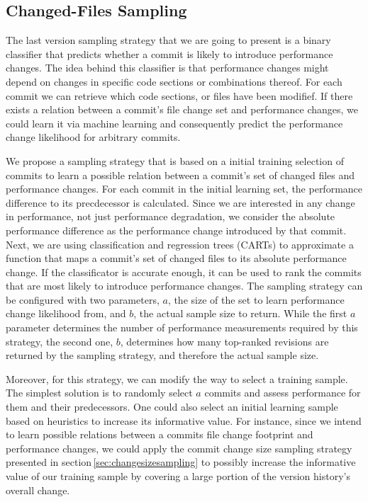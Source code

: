 \subsection{Changed-Files Sampling}
The last version sampling strategy that we are going to present is a binary
classifier that predicts whether a commit is likely to introduce performance
changes. The idea behind this classifier is that performance changes might
depend on changes in specific code sections or combinations thereof. For each
commit we can retrieve which code sections, or files have been modifief. If
there exists a relation between a commit’s file change set and performance
changes, we could learn it via machine learning and consequently predict
the performance change likelihood for arbitrary commits.

We propose a sampling strategy that is based on a initial training selection of
commits to learn a possible relation between a commit’s set of changed files
and performance changes. For each commit in the initial learning set, the
performance difference to its precdecessor is calculated. Since we are
interested in any change in performance, not just performance degradation, we
consider the absolute performance difference as the performance change introduced by that
commit. Next, we are using classification and regression trees (CARTs) to
approximate a function that maps a commit’s set of changed files to its
absolute performance change. If the classificator is accurate enough, it can be
used to rank the commits that are most likely to introduce performance
changes. The sampling strategy can be configured with two parameters, $a$, the
size of the set to learn performance change likelihood from, and $b$, the
actual sample size to return. While the first $a$ parameter determines the
number of performance measurements required by this strategy, the second one,
$b$, determines how many top-ranked revisions are returned by the sampling
strategy, and therefore the actual sample size.

Moreover, for this strategy, we can modify the way to select a training sample.
The simplest solution is to randomly select $a$ commits and assess performance
for them and their predecessors. One could also select an initial learning
sample based on heuristics to increase its informative value. For instance,
since we intend to learn possible relations between a commits file change
footprint and performance changes, we could apply the commit change size
sampling strategy presented in section\,\ref{sec:changesizesampling} to possibly
increase the informative value of our training sample by covering a large
portion of the version history's overall change.

